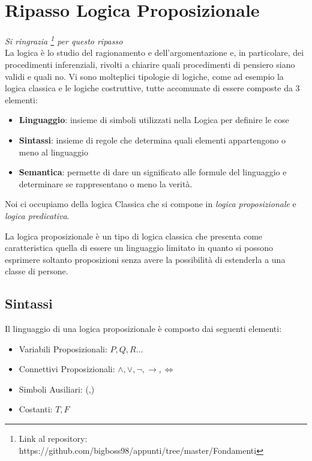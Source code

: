 \documentclass[a4paper,12pt, oneside]{book}
\begin{document}
\section{Ripasso Logica Proposizionale}
\emph{Si ringrazia
  \footnote{Link al repository:
    https://github.com/bigboss98/appunti/tree/master/Fondamenti} per questo
  ripasso}\\   
La logica è lo studio del ragionamento e dell’argomentazione e, in particolare,
dei procedimenti inferenziali, rivolti a chiarire quali	procedimenti di pensiero
siano validi e quali no. Vi sono molteplici tipologie di logiche, come ad
esempio la logica classica e le logiche costruttive, tutte accomunate di essere
composte da 3 elementi: 
\begin{itemize}
  \item \textbf{Linguaggio}: insieme di simboli utilizzati nella Logica per
  definire le cose 
  \item \textbf{Sintassi}: insieme di regole che determina quali elementi
  appartengono o meno al linguaggio 
  \item \textbf{Semantica}: permette di dare un significato alle formule del
  linguaggio e determinare se rappresentano o meno la verità.
\end{itemize}

Noi ci occupiamo della logica Classica che si compone in \textit{logica
  proposizionale} e \textit{logica predicativa}.

La logica proposizionale è un tipo di logica classica che presenta come
caratteristica quella di essere un linguaggio limitato in quanto si possono
esprimere soltanto proposizioni senza avere la possibilità di estenderla a una
classe di persone.
\newpage
\subsection{Sintassi}
Il linguaggio di una logica proposizionale è composto dai seguenti elementi:

\begin{itemize}
  \item Variabili Proposizionali: $P,Q,R \dots$
  \item Connettivi Proposizionali: $\land, \lor, \neg, \rightarrow, \iff$
  \item Simboli Ausiliari: (,)
  \item Costanti: $T,F$
\end{itemize}
\end{document}
